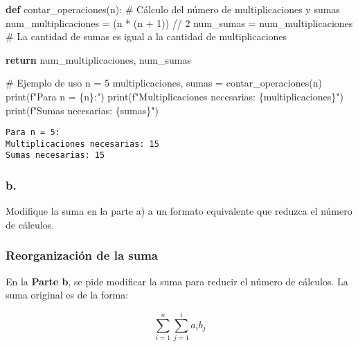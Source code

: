 \documentclass[
  letterpaper,
  DIV=11,
  numbers=noendperiod]{scrartcl}
\newenvironment{Shaded}{\begin{snugshade}}{\end{snugshade}}
\newcommand{\BuiltInTok}[1]{\textcolor[rgb]{0.00,0.23,0.31}{#1}}
\newcommand{\CommentTok}[1]{\textcolor[rgb]{0.37,0.37,0.37}{#1}}
\newcommand{\ControlFlowTok}[1]{\textcolor[rgb]{0.00,0.23,0.31}{\textbf{#1}}}
\newcommand{\DecValTok}[1]{\textcolor[rgb]{0.68,0.00,0.00}{#1}}
\newcommand{\KeywordTok}[1]{\textcolor[rgb]{0.00,0.23,0.31}{\textbf{#1}}}
\newcommand{\NormalTok}[1]{\textcolor[rgb]{0.00,0.23,0.31}{#1}}
\newcommand{\OperatorTok}[1]{\textcolor[rgb]{0.37,0.37,0.37}{#1}}
\newcommand{\SpecialCharTok}[1]{\textcolor[rgb]{0.37,0.37,0.37}{#1}}
\newcommand{\SpecialStringTok}[1]{\textcolor[rgb]{0.13,0.47,0.30}{#1}}
\begin{document}
\begin{Shaded}
\begin{Highlighting}[]
\KeywordTok{def}\NormalTok{ contar\_operaciones(n):}
    \CommentTok{\# Cálculo del número de multiplicaciones y sumas}
\NormalTok{    num\_multiplicaciones }\OperatorTok{=}\NormalTok{ (n }\OperatorTok{*}\NormalTok{ (n }\OperatorTok{+} \DecValTok{1}\NormalTok{)) }\OperatorTok{//} \DecValTok{2}
\NormalTok{    num\_sumas }\OperatorTok{=}\NormalTok{ num\_multiplicaciones  }\CommentTok{\# La cantidad de sumas es igual a la cantidad de multiplicaciones}

    \ControlFlowTok{return}\NormalTok{ num\_multiplicaciones, num\_sumas}

\CommentTok{\# Ejemplo de uso}
\NormalTok{n }\OperatorTok{=} \DecValTok{5}
\NormalTok{multiplicaciones, sumas }\OperatorTok{=}\NormalTok{ contar\_operaciones(n)}
\BuiltInTok{print}\NormalTok{(}\SpecialStringTok{f"Para n = }\SpecialCharTok{\{}\NormalTok{n}\SpecialCharTok{\}}\SpecialStringTok{:"}\NormalTok{)}
\BuiltInTok{print}\NormalTok{(}\SpecialStringTok{f"Multiplicaciones necesarias: }\SpecialCharTok{\{}\NormalTok{multiplicaciones}\SpecialCharTok{\}}\SpecialStringTok{"}\NormalTok{)}
\BuiltInTok{print}\NormalTok{(}\SpecialStringTok{f"Sumas necesarias: }\SpecialCharTok{\{}\NormalTok{sumas}\SpecialCharTok{\}}\SpecialStringTok{"}\NormalTok{)}
\end{Highlighting}
\end{Shaded}

\begin{verbatim}
Para n = 5:
Multiplicaciones necesarias: 15
Sumas necesarias: 15
\end{verbatim}

\subsubsection{b.}\label{b.-2}

Modifique la suma en la parte a) a un formato equivalente que reduzca el
número de cálculos.

\subsubsection{Reorganización de la
suma}\label{reorganizaciuxf3n-de-la-suma}

En la \textbf{Parte b}, se pide modificar la suma para reducir el número
de cálculos. La suma original es de la forma:

\[
\sum_{i=1}^{n} \sum_{j=1}^{i} a_i b_j
\]
\end{document}
